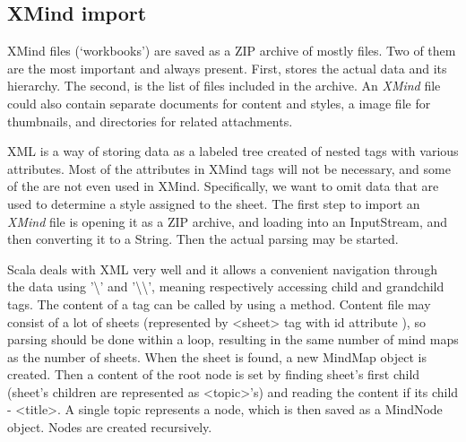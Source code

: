 %
%
%
%
%

\subsection{XMind import}
\label{subsec:xmind-exchange}

XMind files (`workbooks') are saved as a ZIP archive of mostly  files. Two of them are the most important and always present. First,  stores the actual data and its hierarchy. The second,  is the list of files included in the archive. An {\em XMind} file could also contain separate  documents for content and styles, a  image file for thumbnails, and directories for related attachments. \cite{XMind:2009:Format}

XML is a way of storing data as a labeled tree created of nested tags with various attributes. Most of the attributes in  XMind tags will not be  necessary, and some of the are not even used in XMind. Specifically, we want to omit data that are used to determine a style assigned to the sheet. The first step to import an {\em XMind} file is opening it as a ZIP archive, and loading    into an InputStream, and then converting it to a String. Then the actual parsing may be started. 

 Scala deals with XML very well and it allows a convenient navigation through the data using '\textbackslash' and '\textbackslash\textbackslash', meaning respectively accessing child and grandchild tags. The content of a tag can be called by using a  method. Content file may consist of a lot of sheets (represented by <sheet> tag with id attribute ), so parsing should be done within a loop, resulting in the same number of mind maps as the number of sheets. When the sheet is found, a new MindMap object  is created. Then a content of the root node is set by finding sheet's first child (sheet's children are represented as <topic>'s) and reading the content if its child - <title>. A single topic represents a node, which is then saved as a MindNode object. Nodes are created recursively.

